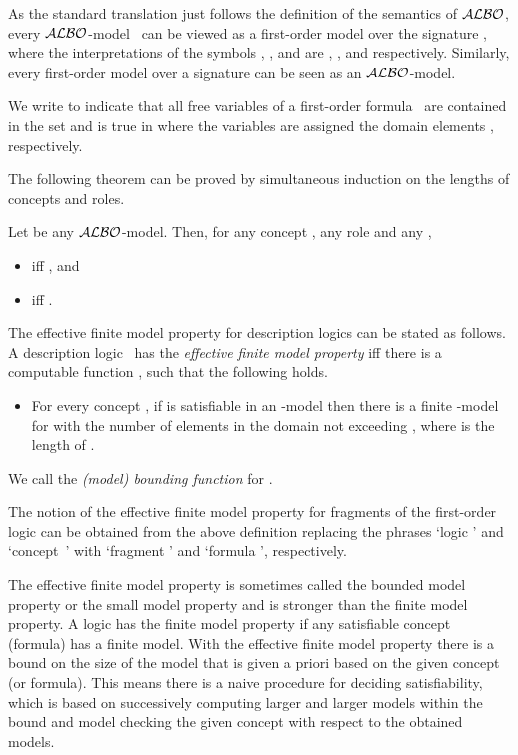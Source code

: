 \documentclass[leqno
,pdflatex
,prodmode
,acmtocl
]{acmsmall}
\newcommand{\mathcmd}[1]{\ensuremath{#1}\xspace}
\newcommand{\dlfont}{\mathcal}
\newcommand{\dl}[1]{\mathcmd{\dlfont{#1}}}
\newcommand{\ALBOid}{\dl{ALBO\smash[t]{\mbox{}}}}
\begin{document}
As the standard translation just follows the definition of the semantics
of \ALBOid, every \ALBOid-model~ can be viewed as a first-order model
over the signature ,
where the interpretations of the symbols
, , and 
are , , and  respectively.
Similarly, every first-order model over a signature 
can be seen as an \ALBOid-model.

We write 
to indicate that all free variables of 
a first-order formula~ 
are contained in the set 
and  is true in  where the variables 
 are assigned the domain elements , respectively.

The following theorem can be proved by simultaneous induction on the
lengths of concepts and roles.
\begin{theorem}\label{theorem: embedding into FO2}
Let  be any \ALBOid-model. Then, for any concept , any role  and any ,
\begin{itemize}
 \item  iff , and
 \item  iff .
\end{itemize}
\end{theorem}

The effective finite model property
 for description logics can be stated as follows.
 A description logic~ has the \emph{effective finite model property} iff
 there is a computable 
 function ,
 such that the following holds.
    \begin{itemize}
     \setlength{\topskip}{0pt}
     \setlength{\itemsep}{0pt}
     \setlength{\itemindent}{0pt}
     \item[]
           For every concept ,  
           if  is satisfiable in an -model
           then there is a finite -model for  
           with the number of elements in the domain not exceeding ,
           where  is the length of . \end{itemize}
We call  the \emph{(model) bounding function} for .
 
 The notion of the effective finite model property for 
 fragments of the first-order logic can be obtained
 from the above definition replacing the phrases `logic '
 and `concept~' with `fragment ' and `formula ', respectively.

The effective finite model property is sometimes called
the bounded model property or the small model property
and is stronger than the finite
model property.
A logic has the finite model property if any satisfiable concept (formula) has
a finite model. 
With the effective finite model property there is a bound on the size
of the model that is given a priori based on the given concept (or formula).
This means there is a naive procedure for deciding satisfiability,
which is based on successively computing larger and larger models within
the bound and model checking the given concept with respect to the obtained models. 
\end{document}
